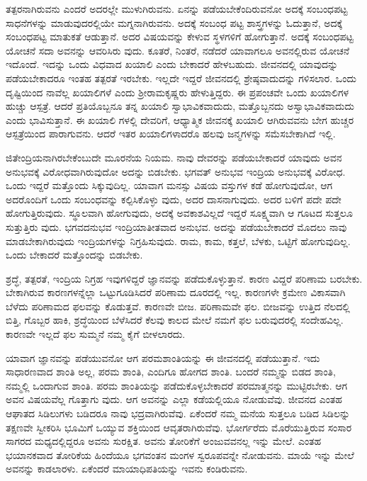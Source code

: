 ತತ್ಪರನಾಗಿರುವನು ಎಂದರೆ ಅದರಲ್ಲೇ ಮುಳುಗಿರುವನು. ಏನನ್ನು ಪಡೆಯಬೇಕೆಂದಿರುವನೋ ಅದಕ್ಕೆ ಸಂಬಂಧಪಟ್ಟ ಸಾಧನೆಗಳನ್ನು ಮಾಡುವುದರಲ್ಲಿಯೇ ಮಗ್ನನಾಗಿರುವನು. ಅದಕ್ಕೆ ಸಂಬಂಧ ಪಟ್ಟ ಶಾಸ್ತ್ರಗಳನ್ನು ಓದುತ್ತಾನೆ, ಅದಕ್ಕೆ ಸಂಬಂಧಪಟ್ಟ ಮಾತುಕತೆ ಆಡುತ್ತಾನೆ. ಅದರ ವಿಷಯವನ್ನು ಕೇಳುವ ಸ್ಥಳಗಳಿಗೆ ಹೋಗುತ್ತಾನೆ. ಅದಕ್ಕೆ ಸಂಬಂಧಪಟ್ಟ ಯೋಚನೆ ಸದಾ ಅವನನ್ನು ಆವರಿಸಿರು ವುದು. ಕೂತರೆ, ನಿಂತರೆ, ನಡೆದರೆ ಯಾವಾಗಲೂ ಅವನಲ್ಲಿರುವ ಯೋಚನೆ ಇದೊಂದೆ. ಇದನ್ನು ಒಂದು ವಿಧವಾದ ಖಯಾಲಿ ಎಂದು ಬೇಕಾದರೆ ಹೇಳಬಹುದು. ಜೀವನದಲ್ಲಿ ಯಾವುದನ್ನು ಪಡೆಯಬೇಕಾದರೂ ಇಂತಹ ತತ್ಪರತೆ ಇರಬೇಕು. ಇಲ್ಲದೇ ಇದ್ದರೆ ಜೀವನದಲ್ಲಿ ಶ್ರೇಷ್ಠವಾದುದನ್ನು ಗಳಿಸಲಾರ. ಒಂದು ದೃಷ್ಟಿಯಿಂದ ನಾವೆಲ್ಲ ಖಯಾಲಿಗಳೆ ಎಂದು ಶ್ರೀರಾಮಕೃಷ್ಣರು ಹೇಳುತ್ತಿದ್ದರು. ಈ ಪ್ರಪಂಚವೇ ಒಂದು ಖಯಾಲಿಗಳ ಹುಚ್ಚು ಆಸ್ಪತ್ರೆ. ಆದರೆ ಪ್ರತಿಯೊಬ್ಬನೂ ತನ್ನ ಖಯಾಲಿ ಸ್ವಾಭಾವಿಕವಾದುದು, ಮತ್ತೊಬ್ಬನದು ಅಸ್ವಾಭಾವಿಕವಾದುದು ಎಂದು ಭಾವಿಸುತ್ತಾನೆ. ಈ ಖಯಾಲಿ ಗಳಲ್ಲಿ ದೇವರಿಗೆ, ಆಧ್ಯಾತ್ಮಿಕ ಜೀವನಕ್ಕೆ ಖಯಾಲಿ ಆಗಿರುವವನು ಬೇಗ ಹುಚ್ಚರ ಆಸ್ಪತ್ರೆಯಿಂದ ಪಾರಾಗುವನು. ಆದರೆ ಇತರ ಖಯಾಲಿಗಳಾದರೊ ಹಲವು ಜನ್ಮಗಳನ್ನು ಸಮೆಸಬೇಕಾಗಿದೆ ಇಲ್ಲಿ.

ಜಿತೇಂದ್ರಿಯನಾಗಿರಬೇಕೆಂಬುದೇ ಮೂರನೆಯ ನಿಯಮ. ನಾವು ದೇವರನ್ನು ಪಡೆಯಬೇಕಾದರೆ ಯಾವುದು ಅವನ ಅನುಭವಕ್ಕೆ ವಿರೋಧವಾಗಿರುವುದೋ ಅದನ್ನು ಬಿಡಬೇಕು. ಭಗವತ್ ಅನುಭವ ಇಂದ್ರಿಯ ಅನುಭವಕ್ಕೆ ವಿರೋಧ. ಒಂದು ಇದ್ದರೆ ಮತ್ತೊಂದು ಸಿಕ್ಕುವುದಿಲ್ಲ. ಯಾವಾಗ ಮನಸ್ಸು ವಿಷಯ ವಸ್ತುಗಳ ಕಡೆ ಹೋಗುವುದೋ, ಆಗ ಅದರೊಂದಿಗೆ ಒಂದು ಸಂಬಂಧವನ್ನು ಕಲ್ಪಿಸಿಕೊಳ್ಳು ವುದು, ಅದರ ದಾಸನಾಗುವುದು. ಅದರ ಬಳಿಗೆ ಪದೇ ಪದೇ ಹೋಗುತ್ತಿರುವುದು. ಸ್ಥೂಲವಾಗಿ ಹೋಗುವುದು, ಅದಕ್ಕೆ ಅವಕಾಶವಿಲ್ಲದೆ ಇದ್ದರೆ ಸೂಕ್ಷ್ಮವಾಗಿ ಆ ಗೂಟದ ಸುತ್ತಲೂ ಸುತ್ತುತ್ತಿರು ವುದು. ಭಗವದನುಭವ ಇಂದ್ರಿಯಾತೀತವಾದ ಅನುಭವ. ಅದನ್ನು ಪಡೆಯಬೇಕಾದರೆ ಮೊದಲು ನಾವು ಮಾಡಬೇಕಾಗಿರುವುದು ಇಂದ್ರಿಯಗಳನ್ನು ನಿಗ್ರಹಿಸುವುದು. ರಾಮ, ಕಾಮ, ಕತ್ತಲೆ, ಬೆಳಕು, ಒಟ್ಟಿಗೆ ಹೋಗುವುದಿಲ್ಲ. ಒಂದು ಬೇಕಾದರೆ ಮತ್ತೊಂದನ್ನು ಬಿಡಬೇಕು.

ಶ್ರದ್ಧೆ, ತತ್ಪರತೆ, ಇಂದ್ರಿಯ ನಿಗ್ರಹ ಇವುಗಳಿದ್ದರೆ ಜ್ಞಾನವನ್ನು ಪಡೆದುಕೊಳ್ಳುತ್ತಾನೆ. ಕಾರಣ ವಿದ್ದರೆ ಪರಿಣಾಮ ಬರಬೇಕು. ಬೇಕಾಗಿರುವ ಕಾರಣಗಳನ್ನೆಲ್ಲಾ ಒಟ್ಟುಗೂಡಿಸಿದರೆ ಪರಿಣಾಮ ದೂರದಲ್ಲಿ ಇಲ್ಲ. ಕಾರಣಗಳೇ ಕ್ರಮೇಣ ವಿಕಾಸವಾಗಿ ಬೆಳೆದು ಪರಿಣಾಮದ ಫಲವನ್ನು ಕೊಡುತ್ತವೆ. ಕಾರಣವೇ ಬೀಜ. ಪರಿಣಾಮವೇ ಫಲ. ಬೀಜವನ್ನು ಉತ್ತಿದ ನೆಲದಲ್ಲಿ ಬಿತ್ತಿ, ಗೊಬ್ಬರ ಹಾಕಿ, ಶ್ರದ್ಧೆಯಿಂದ ಬೆಳೆಸಿದರೆ ಕೆಲವು ಕಾಲದ ಮೇಲೆ ನಮಗೆ ಫಲ ಬರುವುದರಲ್ಲಿ ಸಂದೇಹವಿಲ್ಲ. ಕಾರಣವೇ ಇಲ್ಲದೆ ಫಲ ಸುಮ್ಮನೆ ನಮ್ಮ ಕೈಗೆ ಬೀಳಲಾರದು.

ಯಾವಾಗ ಜ್ಞಾನವನ್ನು ಪಡೆಯುವನೋ ಆಗ ಪರಮಶಾಂತಿಯನ್ನು ಈ ಜೀವನದಲ್ಲಿ ಪಡೆಯುತ್ತಾನೆ. ಇದು ಸಾಧಾರಣವಾದ ಶಾಂತಿ ಅಲ್ಲ, ಪರಮ ಶಾಂತಿ, ಎಂದಿಗೂ ಹೋಗದ ಶಾಂತಿ. ಬಂದರೆ ನಮ್ಮನ್ನು ಬಿಡದ ಶಾಂತಿ, ನಮ್ಮಲ್ಲಿ ಒಂದಾಗುವ ಶಾಂತಿ. ಪರಮ ಶಾಂತಿಯನ್ನು ಪಡೆದುಕೊಳ್ಳಬೇಕಾದರೆ ಪರಮಾತ್ಮನನ್ನು ಮುಟ್ಟಿರಬೇಕು. ಆಗ ಅವನ ವಿಷಯವೆಲ್ಲ ಗೊತ್ತಾಗು ವುದು. ಆಗ ಅವನನ್ನು ಎಲ್ಲಾ ಕಡೆಯಲ್ಲಿಯೂ ನೋಡುವೆವು. ಜೀವನದ ಎಂತಹ ಆಘಾತದ ಸಿಡಿಲುಗಳು ಬಡಿದರೂ ನಾವು ಭದ್ರವಾಗಿರುವೆವು. ಏಕೆಂದರೆ ನಮ್ಮ ಮನೆಯ ಸುತ್ತಲೂ ಬಡಿದ ಸಿಡಿಲನ್ನು ತಕ್ಷಣವೇ ಸ್ವೀಕರಿಸಿ ಭೂಮಿಗೆ ಒಯ್ಯುವ ಶಕ್ತಿಯಿಂದ ಆವೃತರಾಗಿರುವೆವು. ಭೋರ್ಗರೆದು ಮೊರೆಯುತ್ತಿರುವ ಸಂಸಾರ ಸಾಗರದ ಮಧ್ಯದಲ್ಲಿದ್ದರೂ ಅವನು ಸುರಕ್ಷಿತ. ಅವನು ತೋರಿಕೆಗೆ ಅಂಜುವವನಲ್ಲ ಇನ್ನು ಮೇಲೆ. ಎಂತಹ ಭಯಾನಕವಾದ ತೋರಿಕೆಯ ಹಿಂದೆಯೂ ಭಗವಂತನ ಮಂಗಳ ಸ್ವರೂಪವನ್ನೇ ನೋಡುವನು. ಮಾಯೆ ಇನ್ನು ಮೇಲೆ ಅವನನ್ನು ಕಾಡಲಾರಳು. ಏಕೆಂದರೆ ಮಾಯಾಧಿಪತಿಯನ್ನು ಇವನು ಕಂಡಿರುವನು.

